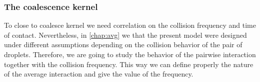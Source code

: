 \subsubsection{The coalescence kernel}
To close to coalesce kernel we need correlation on the collision frequency and time of contact. 
Nevertheless, in \ref{chap:avg} we that the present model were designed under different assumptions depending on the collision behavior of the pair of droplets.
Therefore, we are going to study the behavior of the pairwise interaction together with the collision frequency. 
This way we can define properly the nature of the average interaction and give the value of the frequency. 

